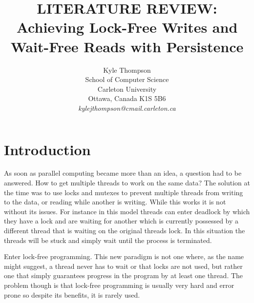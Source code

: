 \documentclass[11pt]{article}       %
\begin{document}


\title{LITERATURE REVIEW:  Achieving Lock-Free Writes and Wait-Free Reads with Persistence}


\author{
Kyle Thompson\\
School of Computer Science\\
Carleton University\\
Ottawa, Canada K1S 5B6\\
{\em kylejthompson@cmail.carleton.ca}
} %

\maketitle



\section{Introduction} \label{intro}

As soon as parallel computing became more than an idea, a question had to be answered. How to
get multiple threads to work on the same data? The solution at the time was to use locks and mutexes 
to prevent multiple threads from writing to the data, or reading while another is writing. While this works 
it is not without its issues. For instance in this model threads can enter deadlock by which they have a lock and are waiting for another which is currently possessed by a different 
thread that is waiting on the original threads lock. In this situation the threads will be stuck and simply 
wait until the process is terminated.

Enter lock-free programming. This new paradigm is not one where, as the name might suggest,
a thread never has to wait or that locks are not used, but rather one that simply guarantees
progress in the program by at least one thread. The problem though is that lock-free 
programming is usually very hard and error prone so despite its benefits, it is rarely used.
\end{document}
